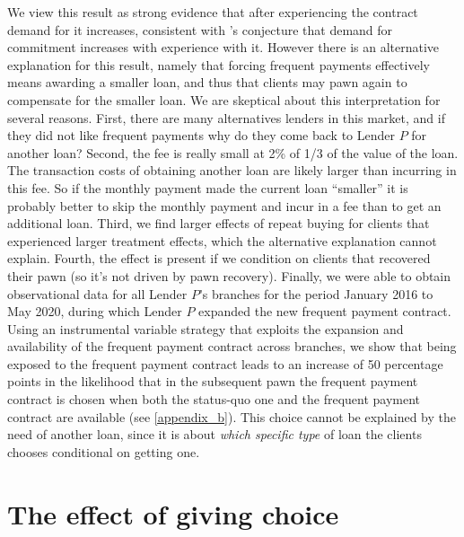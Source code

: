\documentclass[oneside,11pt]{article}
\begin{document}
We view this result as strong evidence that after experiencing the contract demand for it increases, consistent with \cite{Alcohol}'s conjecture that demand for commitment increases with experience with it. However there is an alternative explanation for this result, namely that forcing frequent payments effectively means awarding a smaller loan, and thus that clients may pawn again to compensate for the smaller loan. We are skeptical about this interpretation for several reasons. %
First,  there are many alternatives lenders in this market, and if they did not like frequent payments why do they come back to Lender $P$ for another loan? Second, the fee is really small at 2\% of 1/3 of the value of the loan. The transaction costs of obtaining another loan are likely larger than incurring in this fee. So if the monthly payment made the current loan ``smaller'' it is probably better to skip the monthly payment and incur in a fee than to get an additional loan. Third, we find larger effects of repeat buying for clients that experienced larger treatment effects, which the alternative explanation cannot explain. Fourth, the effect is present if we condition on clients that recovered their pawn (so it's not driven by pawn recovery). Finally, we were able to obtain observational data for all Lender $P$'s branches for the period January 2016 to May 2020, during which Lender $P$ expanded the new frequent payment contract. Using an instrumental variable strategy that exploits the expansion and availability of the frequent payment contract across branches, we show that being exposed to the frequent payment contract leads to an increase of 50 percentage points in the likelihood that in the subsequent pawn the frequent payment contract is chosen when both the status-quo one and the frequent payment contract are available (see \ref{appendix_b}). This choice cannot be explained by the need of another loan, since it is about \textit{which specific type} of loan the clients chooses conditional on getting one.




\section{The effect of giving choice} \label{fee-choice}
\end{document}
